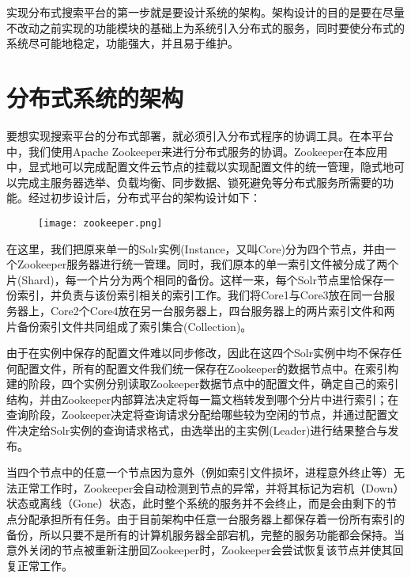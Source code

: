 实现分布式搜索平台的第一步就是要设计系统的架构。架构设计的目的是要在尽量不改动之前实现的功能模块的基础上为系统引入分布式的服务，同时要使分布式的系统尽可能地稳定，功能强大，并且易于维护。

\section{分布式系统的架构}

要想实现搜索平台的分布式部署，就必须引入分布式程序的协调工具。在本平台中，我们使用Apache Zookeeper来进行分布式服务的协调。Zookeeper在本应用中，显式地可以完成配置文件云节点的挂载以实现配置文件的统一管理，隐式地可以完成主服务器选举、负载均衡、同步数据、锁死避免等分布式服务所需要的功能。经过初步设计后，分布式平台的架构设计如下：
\begin{figure}[!htp]
  \centering
  \texttt{[image: zookeeper.png]}
\end{figure}

在这里，我们把原来单一的Solr实例(Instance，又叫Core)分为四个节点，并由一个Zookeeper服务器进行统一管理。同时，我们原本的单一索引文件被分成了两个片(Shard)，每一个片分为两个相同的备份。这样一来，每个Solr节点里恰保存一份索引，并负责与该份索引相关的索引工作。我们将Core1与Core3放在同一台服务器上，Core2个Core4放在另一台服务器上，四台服务器上的两片索引文件和两片备份索引文件共同组成了索引集合(Collection)。

由于在实例中保存的配置文件难以同步修改，因此在这四个Solr实例中均不保存任何配置文件，所有的配置文件我们统一保存在Zookeeper的数据节点中。在索引构建的阶段，四个实例分别读取Zookeeper数据节点中的配置文件，确定自己的索引结构，并由Zookeeper内部算法决定将每一篇文档转发到哪个分片中进行索引；在查询阶段，Zookeeper决定将查询请求分配给哪些较为空闲的节点，并通过配置文件决定给Solr实例的查询请求格式，由选举出的主实例(Leader)进行结果整合与发布。

当四个节点中的任意一个节点因为意外（例如索引文件损坏，进程意外终止等）无法正常工作时，Zookeeper会自动检测到节点的异常，并将其标记为宕机（Down）状态或离线（Gone）状态，此时整个系统的服务并不会终止，而是会由剩下的节点分配承担所有任务。由于目前架构中任意一台服务器上都保存着一份所有索引的备份，所以只要不是所有的计算机服务器全部宕机，完整的服务功能都会保持。当意外关闭的节点被重新注册回Zookeeper时，Zookeeper会尝试恢复该节点并使其回复正常工作。

